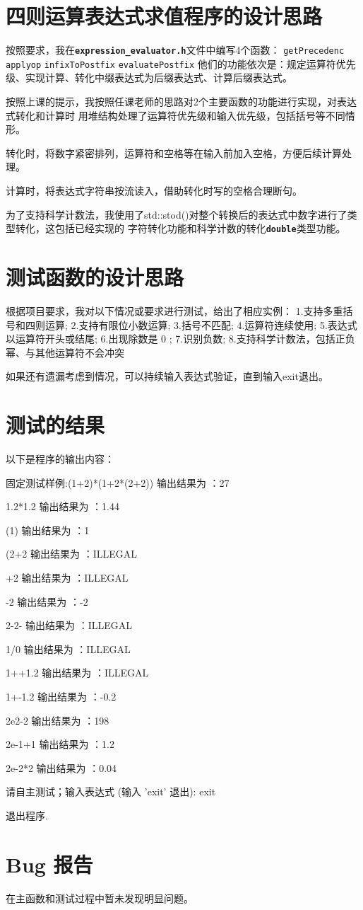 \documentclass[UTF8]{ctexart}
\begin{document}
\pagestyle{fancy}
\fancyhead{}

\section{四则运算表达式求值程序的设计思路}
按照要求，我在\textbf{\texttt{expression\_evaluator.h}}文件中编写4个函数：
\texttt{getPrecedenc}
\texttt{applyop}
\texttt{infixToPostfix}
\texttt{evaluatePostfix}
他们的功能依次是：规定运算符优先级、实现计算、转化中缀表达式为后缀表达式、计算后缀表达式。\par
按照上课的提示，我按照任课老师的思路对2个主要函数的功能进行实现，对表达式转化和计算时
用堆结构处理了运算符优先级和输入优先级，包括括号等不同情形。\par
转化时，将数字紧密排列，运算符和空格等在输入前加入空格，方便后续计算处理。\par
计算时，将表达式字符串按流读入，借助转化时写的空格合理断句。\par
为了支持科学计数法，我使用了std::stod()对整个转换后的表达式中数字进行了类型转化，这包括已经实现的
字符转化功能和科学计数的转化\textbf{\texttt{double}}类型功能。
\section{测试函数的设计思路}
根据项目要求，我对以下情况或要求进行测试，给出了相应实例：
1.支持多重括号和四则运算;
2.支持有限位小数运算;
3.括号不匹配;
4.运算符连续使用;
5.表达式以运算符开头或结尾;
6.出现除数是 0 ;
7.识别负数;
8.支持科学计数法，包括正负幂、与其他运算符不会冲突 \par
如果还有遗漏考虑到情况，可以持续输入表达式验证，直到输入exit退出。
\section{测试的结果}
以下是程序的输出内容：\par
固定测试样例:(1+2)*(1+2*(2+2)) 输出结果为 ：27\par
1.2*1.2 输出结果为 ：1.44\par
(1) 输出结果为 ：1\par
(2+2 输出结果为 ：ILLEGAL\par
+2 输出结果为 ：ILLEGAL\par
-2 输出结果为 ：-2\par
2-2- 输出结果为 ：ILLEGAL\par
1/0 输出结果为 ：ILLEGAL\par
1++1.2 输出结果为 ：ILLEGAL\par
1+-1.2 输出结果为 ：-0.2\par
2e2-2 输出结果为 ：198\par
2e-1+1 输出结果为 ：1.2\par
2e-2*2 输出结果为 ：0.04\par
请自主测试；输入表达式 (输入 'exit' 退出): exit\par
退出程序.
\section{Bug 报告}
在主函数和测试过程中暂未发现明显问题。
\end{document}
